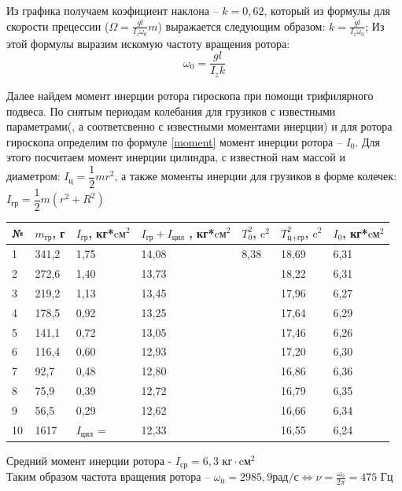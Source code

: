 \documentclass[a4paper,14pt]{extarticle}
\begin{document}
    Из графика получаем коэфициент наклона -- $k = 0,62$, который из формулы для скорости прецессии ($\Omega = \frac{gl}{I_z\omega_0}m$) выражается следующим образом: $k = \frac{gl}{I_z\omega_0}$;
    Из этой формулы выразим искомую частоту вращения ротора: $$\omega_0 = \frac{gl}{I_z k}$$
 
 	Далее найдем момент инерции ротора гироскопа при помощи трифилярного подвеса. По снятым периодам колебания для грузиков с известными параметрами(, а соответсвенно с известными моментами инерции) и для ротора гироскопа определим по формуле \eqref{moment} момент инерции ротора -- $I_0$. Для этого посчитаем момент инерции цилиндра,  с известной нам массой и диаметром: $I_\text{ц} = \dfrac{1}{2}mr^2$, а также моменты инерции для грузиков в форме колечек: $I_\text{гр} = \dfrac{1}{2}m(r^2 + R^2)$   
\begin{table}[!ht]
	\centering
	\begin{tabular}{|l|l|l|l|l|l|l|}
		\hline
		№ & $m_\text{гр}$, г & $I_\text{гр}$, кг*$\text{cм}^2$ & $I_\text{гр} + I_\text{цил}$ , кг*$\text{cм}^2$ & $T_0^2$, $\text{c}^2$ & $T_\text{ц+гр}^2$, $\text{c}^2$ & $I_0$, кг*$\text{cм}^2$ \\ \hline
		1 & 341,2 & 1,75 & 14,08 & 8,38 & 18,69 & 6,31 \\ \hline
		2 & 272,6 & 1,40 & 13,73 & ~ & 18,22 & 6,31 \\ \hline
		3 & 219,2 & 1,13 & 13,45 & ~ & 17,96 & 6,27 \\ \hline
		4 & 178,5 & 0,92 & 13,25 & ~ & 17,64 & 6,29 \\ \hline
		5 & 141,1 & 0,72 & 13,05 & ~ & 17,46 & 6,26 \\ \hline
		6 & 116,4 & 0,60 & 12,93 & ~ & 17,20 & 6,30 \\ \hline
		7 & 92,7 & 0,48 & 12,80 & ~ & 16,86 & 6,36 \\ \hline
		8 & 75,9 & 0,39 & 12,72 & ~ & 16,79 & 6,35 \\ \hline
		9 & 56,5 & 0,29 & 12,62 & ~ & 16,66 & 6,34 \\ \hline
		10 & 1617 & $I_\text{цил}$ = & 12,33 & ~ & 16,55 & 6,24 \\ \hline
	\end{tabular}
\end{table}
	
	Средний момент инерции ротора - $I_\text{ср} = 6,3 \text{ кг}\cdot\text{cм}^2$\\
	Таким образом частота вращения ротора -- $\omega_0 = 2985,9 \text{рад/с} \Leftrightarrow \nu = \frac{\omega_0}{2\pi} = 475\text{ Гц} $
\end{document}
